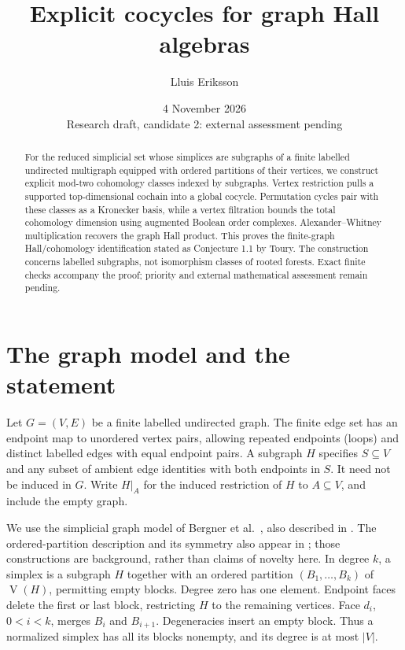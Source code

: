 \documentclass[11pt,a4paper]{article}
\title{Explicit cocycles for graph Hall algebras}
\author{Lluis Eriksson}
\date{4 November 2026\\\small Research draft, candidate 2: external assessment pending}
\newcommand{\verts}{\operatorname{V}}
\begin{document}
\maketitle
\begin{abstract}
For the reduced simplicial set whose simplices are subgraphs of a finite labelled
undirected multigraph equipped with ordered partitions of their vertices, we construct
explicit mod-two cohomology classes indexed by subgraphs. Vertex restriction
pulls a supported top-dimensional cochain into a global cocycle. Permutation
cycles pair with these classes as a Kronecker basis, while a vertex filtration
bounds the total cohomology dimension using augmented Boolean order complexes.
Alexander--Whitney multiplication recovers the graph Hall product. This proves
the finite-graph Hall/cohomology identification stated as
Conjecture 1.1 by Toury. The construction concerns labelled subgraphs, not
isomorphism classes of rooted forests. Exact finite checks accompany the proof;
priority and external mathematical assessment remain pending.
\end{abstract}

\section{The graph model and the statement}
Let $G=(V,E)$ be a finite labelled undirected graph. The finite edge set has
an endpoint map to unordered vertex pairs, allowing repeated endpoints (loops)
and distinct labelled edges with equal endpoint pairs. A subgraph $H$ specifies
$S\subseteq V$ and any subset of ambient edge identities with both endpoints
in $S$.
It need not be induced in $G$. Write $H|_A$ for the induced restriction of $H$
to $A\subseteq V$, and include the empty graph.

We use the simplicial graph model of Bergner et al.\ \cite{wald}, also described
in \cite{bergner,toury}. The ordered-partition description and its symmetry
also appear in \cite[Examples 3.9 and 5.11]{cms}; those constructions are
background, rather than claims of novelty here. In degree $k$, a simplex is a subgraph $H$ together with
an ordered partition $(B_1,\ldots,B_k)$ of $\verts(H)$, permitting empty blocks.
Degree zero has one element. Endpoint faces delete the first or last block,
restricting $H$ to the remaining vertices. Face $d_i$, $0<i<k$, merges $B_i$
and $B_{i+1}$. Degeneracies insert an empty block. Thus a normalized simplex
has all its blocks nonempty, and its degree is at most $|V|$.
\end{document}
